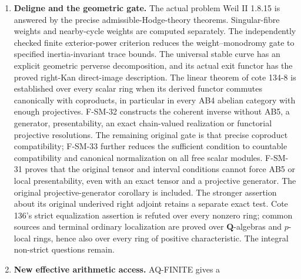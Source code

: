 \documentclass[11pt,a4paper]{article}
\theoremstyle{definition}\newtheorem{definition}[theorem]{Definition}
\theoremstyle{remark}\newtheorem{remark}[theorem]{Remark}
\begin{document}
\begin{enumerate}
classified in every simple complex adjoint type, with exact finite
quotients and orbit counts. Outer-invariant classes exist exactly
outside the even-rank A types. Opposite choices exist in every type;
the all-choice criterion is now fully determined in every simple type.
Besides the stated classical positive cases, it holds in $G_2$; it
fails in $F_4,E_6,E_7,E_8$, with complete exceptional counterexamples.
The recovered cote 18 comparison list has precisely scoped classical
Betti, de Rham, crystalline and integral $p$-adic answers.
Its adelic genericity assertion on physical page 49/footer 48 is
proved by the short deduction BR-18-AD01 from exact local results.
Cote 66's named affine torsion-coefficient comparison cases are
affirmative; its universal degree-zero test is exactly henselianity.
\item \textbf{Deligne and the geometric gate.} The actual problem
Weil II 1.8.15 is answered by the precise admissible-Hodge-theory
theorems. Singular-fibre weights and nearby-cycle weights are computed
separately. The independently checked finite exterior-power criterion reduces the weight--monodromy gate to specified
inertia-invariant trace bounds. The universal stable curve has an explicit
geometric perverse decomposition, and its actual exit functor has the
proved right-Kan direct-image description. The linear theorem of cote
134-8 is established over every scalar ring when its derived functor
commutes canonically with coproducts, in particular in every AB4
abelian category with enough projectives. F-SM-32 constructs the
coherent inverse without AB5, a generator, presentability, an exact
chain-valued realization or functorial projective resolutions. The
remaining original gate is that precise coproduct compatibility;
F-SM-33 further reduces the sufficient condition to countable
compatibility and canonical normalization on all free scalar modules.
F-SM-31 proves that the original tensor and interval conditions cannot
force AB5 or local presentability, even with an exact tensor and a
projective generator. The original projective-generator
corollary is included. The stronger assertion about its original
underived right adjoint retains a separate exact test. Cote 136's
strict equalization assertion is refuted over every nonzero ring;
common sources and terminal ordinary localization are proved over
$\mathbf Q$-algebras and $p$-local rings, hence also over every ring
of positive characteristic. The integral non-strict questions remain.
\item \textbf{New effective arithmetic access.} AQ-FINITE gives a

\end{enumerate}
\end{document}
